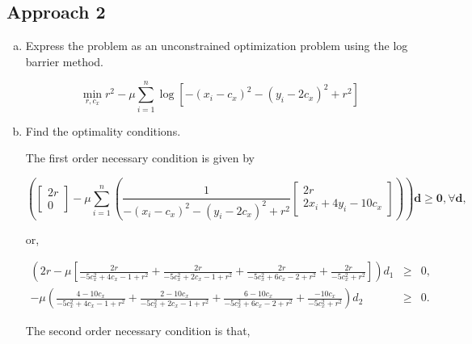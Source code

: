 \documentclass{article}
\begin{document}
\subsection{Approach 2}

\begin{enumerate}[a)]
	\item Express the problem as an unconstrained optimization problem using the log barrier method.
	
	\begin{equation*}
	\min_{r,c_x} r^2 - \mu \sum_{i=1}^n \log\left[-(x_i - c_x)^2 - (y_i - 2c_x)^2 
	+ r^2\right]
	\end{equation*}
	
	\item Find the optimality conditions.
	
	The first order necessary condition is given by
	
	\begin{equation*}
	\left(\begin{bmatrix}2r \\ 0\end{bmatrix} - \mu \sum_{i=1}^n \left(\frac{1}{-(x_i - c_x)^2 - (y_i - 2c_x)^2 + r^2} \begin{bmatrix}2r \\ 2x_i + 4y_i - 10c_x\end{bmatrix}\right)\right)\mathbf{d} \ge \mathbf{0}, \forall \mathbf{d},
	\end{equation*}
	
	or,
	
	\begin{eqnarray*}
	\left(2r - \mu \left[\frac{2r}{-5c_x^2 + 4c_x - 1 + r^2} + \frac{2r}{-5c_x^2 + 2c_x - 1 +r^2} + \frac{2r}{-5c_x^2 + 6c_x - 2 +r^2} + \frac{2r}{-5c_x^2 +r^2}\right]\right)d_1 &\ge& 0,\\
	-\mu \left(\frac{4-10c_x}{-5c_x^2 + 4c_x - 1 + r^2} + \frac{2-10c_x}{-5c_x^2 + 2c_x - 1 +r^2} + \frac{6-10c_x}{-5c_x^2 + 6c_x - 2 +r^2} + \frac{-10c_x}{-5c_x^2 +r^2}\right)d_2 &\ge& 0.
	\end{eqnarray*}
	
	The second order necessary condition is that,
	


\end{enumerate}
\end{document}

